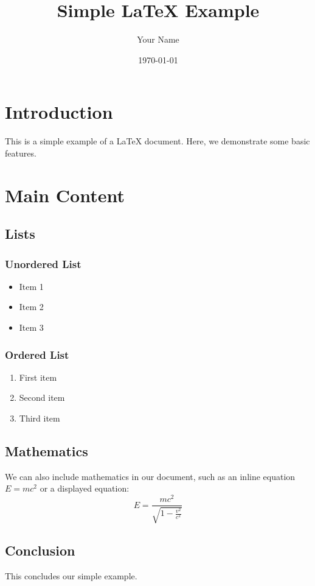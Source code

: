 \documentclass{article}
\title{Simple LaTeX Example}
\author{Your Name}
\date{\today}
\begin{document}
\maketitle

\section{Introduction}

This is a simple example of a LaTeX document. Here, we demonstrate some basic features.

\section{Main Content}

\subsection{Lists}

\subsubsection*{Unordered List}

\begin{itemize}
    \item Item 1
    \item Item 2
    \item Item 3
\end{itemize}

\subsubsection*{Ordered List}

\begin{enumerate}
    \item First item
    \item Second item
    \item Third item
\end{enumerate}

\subsection{Mathematics}

We can also include mathematics in our document, such as an inline equation \( E = mc^2 \) or a displayed equation:
\[
E = \frac{m c^2}{\sqrt{1 - \frac{v^2}{c^2}}}
\]

\subsection{Conclusion}

This concludes our simple example.
\end{document}
